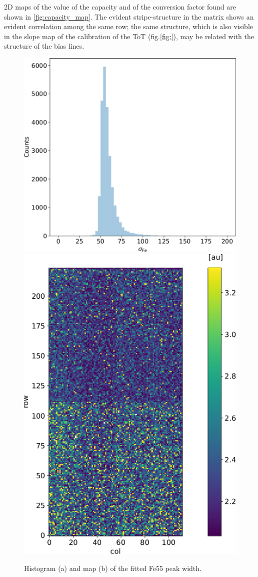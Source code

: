         2D maps of the value of the capacity and of the conversion factor found are shown in \ref{fig:capacity_map}. The evident stripe-structure in the matrix shows an evident correlation among the same row; the same structure, which is also visible in the slope map of the calibration of the ToT (fig.\ref{fig:}), may be related with the structure of the bias lines.
        \begin{figure}[h!]
            \centering
            \includegraphics[width=.57\linewidth]{figures/charaterization/sigma_fe55.pdf}            
            \includegraphics[width=.40\linewidth]{figures/charaterization/Fe_width_au_map.pdf}   
            \caption{Histogram (a) and map (b) of the fitted Fe55 peak width.}
            \label{fig:Fe55_resolution}
        \end{figure}  
